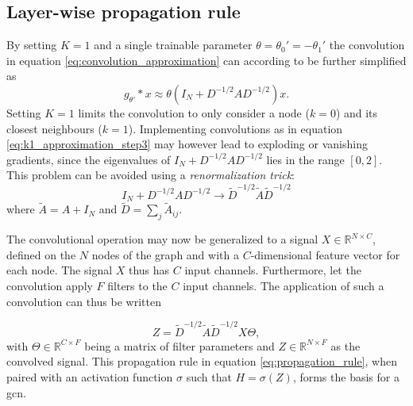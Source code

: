 \subsection{Layer-wise propagation rule}
By setting $K = 1$ and a single trainable parameter $\theta = \theta_0' = -\theta_1'$ the convolution in equation \eqref{eq:convolution_approximation} can according to \cite{kipf_semi_supervised} be further simplified as 
\begin{equation}
    g_{\theta'} * x \approx \theta \left(I_N + D^{-1/2}AD^{-1/2} \right)x. 
    \label{eq:k1_approximation_step3}
\end{equation}
Setting $K=1$ limits the convolution to only consider a node ($k=0$) and its closest neighbours ($k=1$). Implementing convolutions as in equation \eqref{eq:k1_approximation_step3} may however lead to exploding or vanishing gradients, since the eigenvalues of $I_N + D^{-1/2}AD^{-1/2}$ lies in the range $[0, 2]$. This problem can be avoided using a \textit{renormalization trick}:
\begin{equation}
    I_N + D^{-1/2}AD^{-1/2} \rightarrow \tilde{D}^{-1/2} \tilde{A} \tilde{D}^{-1/2}
    \label{eq:renormalization_trick}
\end{equation}
where $\tilde{A} = A + I_N$ and $\tilde{D} = \sum_j \tilde{A}_{ij}$.

The convolutional operation may now be generalized to a signal $X \in \mathbb{R}^{N \times C}$, defined on the $N$ nodes of the graph and with a $C$-dimensional feature vector for each node. The signal $X$ thus has $C$ input channels. Furthermore, let the convolution apply $F$ filters to the $C$ input channels. The application of such a convolution can thus be written

\begin{equation}
    Z = \tilde{D}^{-1/2} \tilde{A} \tilde{D}^{-1/2} X \Theta,
    \label{eq:propagation_rule}
\end{equation}
with $\Theta \in \mathbb{R}^{C\times F}$ being a matrix of filter parameters and $Z \in \mathbb{R}^{N\times F}$ as the convolved signal. This propagation rule in equation \eqref{eq:propagation_rule}, when paired with an activation function $\sigma$ such that $H = \sigma\left(Z \right)$, forms the basis for a \acrshort{gcn}. 

